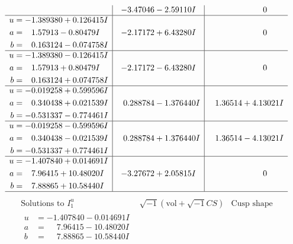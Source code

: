 \documentclass[1p]{elsarticle_modified}
\theoremstyle{definition}
\newcommand{\I}{\sqrt{-1}}
\begin{document}
$$\begin{array}{c|c|c}
 & -3.47046 - 2.59110 I & \phantom{-0.000000 } 0 \\ \hline\begin{aligned}
u &= -1.389380 + 0.126415 I \\
a &= \phantom{-}1.57913 - 0.80479 I \\
b &= \phantom{-}0.163124 - 0.074758 I\end{aligned}
 & -2.17172 + 6.43280 I & \phantom{-0.000000 } 0 \\ \hline\begin{aligned}
u &= -1.389380 - 0.126415 I \\
a &= \phantom{-}1.57913 + 0.80479 I \\
b &= \phantom{-}0.163124 + 0.074758 I\end{aligned}
 & -2.17172 - 6.43280 I & \phantom{-0.000000 } 0 \\ \hline\begin{aligned}
u &= -0.019258 + 0.599596 I \\
a &= \phantom{-}0.340438 + 0.021539 I \\
b &= -0.531337 - 0.774461 I\end{aligned}
 & \phantom{-}0.288784 - 1.376440 I & \phantom{-}1.36514 + 4.13021 I \\ \hline\begin{aligned}
u &= -0.019258 - 0.599596 I \\
a &= \phantom{-}0.340438 - 0.021539 I \\
b &= -0.531337 + 0.774461 I\end{aligned}
 & \phantom{-}0.288784 + 1.376440 I & \phantom{-}1.36514 - 4.13021 I \\ \hline\begin{aligned}
u &= -1.407840 + 0.014691 I \\
a &= \phantom{-}7.96415 + 10.48020 I \\
b &= \phantom{-}7.88865 + 10.58440 I\end{aligned}
 & -3.27672 + 2.05815 I & \phantom{-0.000000 } 0\\
 \hline 
 \end{array}$$\newpage$$\begin{array}{c|c|c}  
\text{Solutions to }I^u_{1}& \I (\text{vol} + \sqrt{-1}CS) & \text{Cusp shape}\\
 \hline 
\begin{aligned}
u &= -1.407840 - 0.014691 I \\
a &= \phantom{-}7.96415 - 10.48020 I \\
b &= \phantom{-}7.88865 - 10.58440 I\end{aligned}

\end{array}$$
\end{document}
